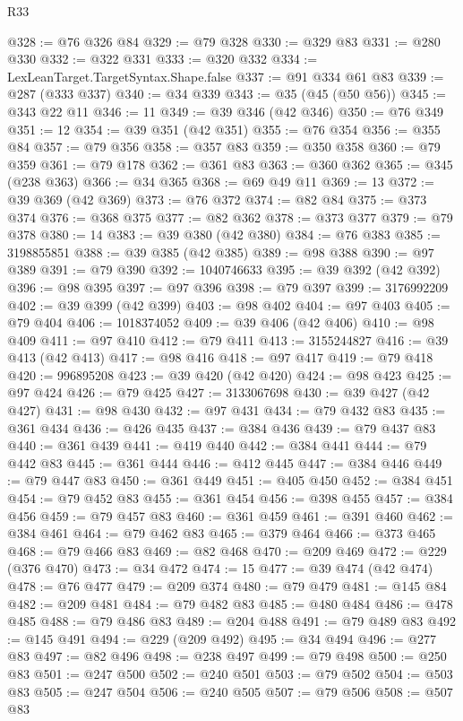 \begin{lexlean}{R33}
\begin{coremodule}
@328 := @76 @326 @84
@329 := @79 @328
@330 := @329 @83
@331 := @280 @330
@332 := @322 @331
@333 := @320 @332
@334 := LexLeanTarget.TargetSyntax.Shape.false
@337 := @91 @334 @61 @83
@339 := @287 (@333 @337)
@340 := @34 @339
@343 := @35 (@45 (@50 @56))
@345 := @343 @22 @11
@346 := 11
@349 := @39 @346 (@42 @346)
@350 := @76 @349
@351 := 12
@354 := @39 @351 (@42 @351)
@355 := @76 @354
@356 := @355 @84
@357 := @79 @356
@358 := @357 @83
@359 := @350 @358
@360 := @79 @359
@361 := @79 @178
@362 := @361 @83
@363 := @360 @362
@365 := @345 (@238 @363)
@366 := @34 @365
@368 := @69 @49 @11
@369 := 13
@372 := @39 @369 (@42 @369)
@373 := @76 @372
@374 := @82 @84
@375 := @373 @374
@376 := @368 @375
@377 := @82 @362
@378 := @373 @377
@379 := @79 @378
@380 := 14
@383 := @39 @380 (@42 @380)
@384 := @76 @383
@385 := 3198855851
@388 := @39 @385 (@42 @385)
@389 := @98 @388
@390 := @97 @389
@391 := @79 @390
@392 := 1040746633
@395 := @39 @392 (@42 @392)
@396 := @98 @395
@397 := @97 @396
@398 := @79 @397
@399 := 3176992209
@402 := @39 @399 (@42 @399)
@403 := @98 @402
@404 := @97 @403
@405 := @79 @404
@406 := 1018374052
@409 := @39 @406 (@42 @406)
@410 := @98 @409
@411 := @97 @410
@412 := @79 @411
@413 := 3155244827
@416 := @39 @413 (@42 @413)
@417 := @98 @416
@418 := @97 @417
@419 := @79 @418
@420 := 996895208
@423 := @39 @420 (@42 @420)
@424 := @98 @423
@425 := @97 @424
@426 := @79 @425
@427 := 3133067698
@430 := @39 @427 (@42 @427)
@431 := @98 @430
@432 := @97 @431
@434 := @79 @432 @83
@435 := @361 @434
@436 := @426 @435
@437 := @384 @436
@439 := @79 @437 @83
@440 := @361 @439
@441 := @419 @440
@442 := @384 @441
@444 := @79 @442 @83
@445 := @361 @444
@446 := @412 @445
@447 := @384 @446
@449 := @79 @447 @83
@450 := @361 @449
@451 := @405 @450
@452 := @384 @451
@454 := @79 @452 @83
@455 := @361 @454
@456 := @398 @455
@457 := @384 @456
@459 := @79 @457 @83
@460 := @361 @459
@461 := @391 @460
@462 := @384 @461
@464 := @79 @462 @83
@465 := @379 @464
@466 := @373 @465
@468 := @79 @466 @83
@469 := @82 @468
@470 := @209 @469
@472 := @229 (@376 @470)
@473 := @34 @472
@474 := 15
@477 := @39 @474 (@42 @474)
@478 := @76 @477
@479 := @209 @374
@480 := @79 @479
@481 := @145 @84
@482 := @209 @481
@484 := @79 @482 @83
@485 := @480 @484
@486 := @478 @485
@488 := @79 @486 @83
@489 := @204 @488
@491 := @79 @489 @83
@492 := @145 @491
@494 := @229 (@209 @492)
@495 := @34 @494
@496 := @277 @83
@497 := @82 @496
@498 := @238 @497
@499 := @79 @498
@500 := @250 @83
@501 := @247 @500
@502 := @240 @501
@503 := @79 @502
@504 := @503 @83
@505 := @247 @504
@506 := @240 @505
@507 := @79 @506
@508 := @507 @83

\end{coremodule}
\end{lexlean}
